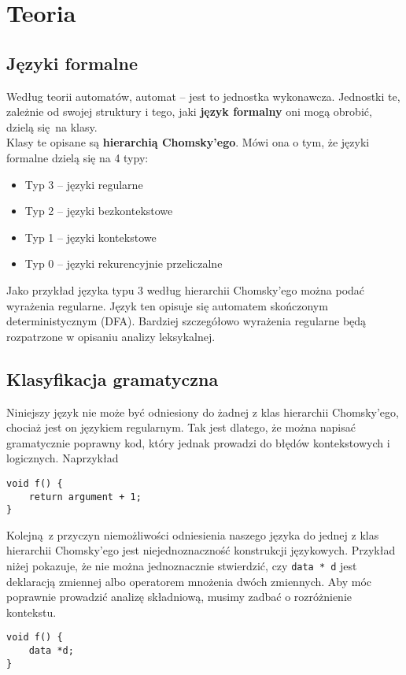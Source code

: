 \section{Teoria}

	\subsection{Języki formalne}

		Według teorii automatów, automat -- jest to jednostka wykonawcza. Jednostki te, zależnie od swojej
		struktury i tego, jaki \textbf{język formalny} oni mogą obrobić, dzielą się na klasy.
		\\
		
		Klasy te opisane są \textbf{hierarchią Chomsky’ego}. Mówi ona o tym, że języki formalne dzielą się na
		4 typy:
		\begin{itemize}
			\item Typ 3 -- języki regularne
			\item Typ 2 -- języki bezkontekstowe
			\item Typ 1 -- języki kontekstowe
			\item Typ 0 -- języki rekurencyjnie przeliczalne
		\end{itemize}
		
		\spacing

		Jako przykład języka typu 3 według hierarchii Chomsky'ego można podać wyrażenia regularne. Język ten
		opisuje się automatem skończonym deterministycznym (DFA). Bardziej szczegółowo wyrażenia regularne będą
		rozpatrzone w opisaniu analizy leksykalnej.
		
	\subsection{Klasyfikacja gramatyczna}

		Niniejszy język nie może być odniesiony do żadnej z klas hierarchii Chomsky'ego, chociaż jest on
		językiem regularnym. Tak jest dlatego, że można napisać gramatycznie poprawny kod, który jednak prowadzi
		do błędów kontekstowych i logicznych. Naprzykład 
		
		\spacing
		
\begin{lstlisting}[caption={}, label={lst:ambigous-production}]
void f() {
	return argument + 1;
}
\end{lstlisting}

		\spacing
		
		Kolejną z przyczyn niemożliwości odniesienia naszego języka do jednej z klas hierarchii Chomsky'ego
		jest niejednoznaczność konstrukcji językowych. Przykład niżej pokazuje, że nie można jednoznacznie
		stwierdzić, czy \texttt{data * d} jest deklaracją zmiennej albo operatorem mnożenia dwóch zmiennych.
		Aby móc poprawnie prowadzić analizę składniową, musimy zadbać o rozróżnienie kontekstu.

		\spacing
		
\begin{lstlisting}[caption={}, label={lst:ambigous-production}]
void f() {
	data *d;
}
\end{lstlisting}
